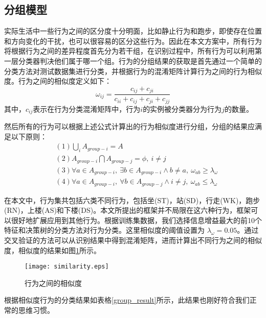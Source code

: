 \subsection{分组模型}
\par 实际生活中一些行为之间的区分度十分明面，比如静止行为和跑步，即使存在位置和方向变化的干扰，也可以很容易的区分这些行为\cite{lu2010jigsaw}。因此在本文方案中，所有行为将根据行为之间的差异程度首先分为若干组，在识别过程中，所有行为可以利用第一层分类器判决他们属于哪一个组。行为的分组结果的获取是首先通过一个简单的分类方法对测试数据集进行分类，并根据行为的混淆矩阵计算行为之间的行为相似度。行为之间的相似度定义如下：
\begin{equation}
    \omega_{ij}=\frac { c_{ij}+c_{ji} }{ c_{ii}+c_{ij}+c_{ji}+c_{jj} }
\end{equation}
其中，$c_{ij}$表示在行为分类混淆矩阵中，行为$i$的实例被分类器分为行为$j$的数量。
\par 然后所有的行为可以根据上述公式计算出的行为相似度进行分组，分组的结果应满足以下原则：
\begin{equation}
    \begin{aligned}
    &(1) \bigcup_i A_{group-i}=A \\ \
    &(2) A_{group-i}\bigcap A_{group-j}=\phi,\: i\neq j \\ \
    &(3) \forall a\in A_{group-i},\: \exists b\in A_{group-i}\wedge b\neq a, \: \omega_{ab} \geq \lambda_\omega\\ \
    &(4) \forall a\in A_{group-i},\: \forall b\in A_{group-j}\wedge i\neq j, \: \omega_{ab} \leq \lambda_\omega
    \end{aligned}
\end{equation}
\par 在本文中，行为集共包括六类不同行为，包括坐(ST)，站(SD)，行走(WK)，跑步(RN)，上楼(AS)和下楼(DS)。本文所提出的框架并不局限在这六种行为，框架可以很好地扩展应用到其他行为。根据训练集数据，我们选择信息增益最大的前10个特征和决策树的分类方法对行为分类。这里相似度的阈值设置为 $\lambda_\omega = 0.05$。通过交叉验证的方法可以从识别结果中得到混淆矩阵，进而计算出不同行为之间的相似度，相似度的结果如图\ref{similarity}所示。
\begin{figure}[!htb]
\centering
\texttt{[image: similarity.eps]}
\caption{行为之间的相似度}\label{similarity}
\end{figure}

\par 根据相似度行为的分类结果如表格\ref{group_result}所示，此结果也刚好符合我们正常的思维习惯。

